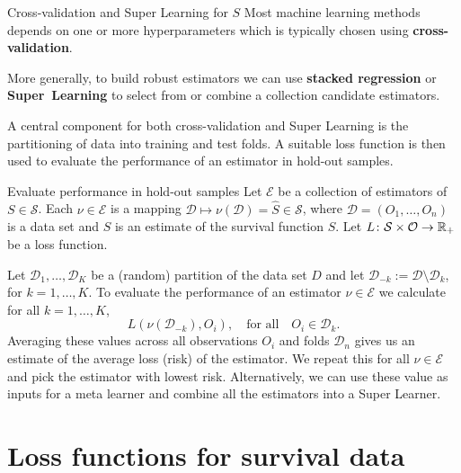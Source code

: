 \documentclass[smaller]{beamer}\usepackage{listings}
\newcommand{\est}{\ensuremath{\nu}}
\begin{document}
\begin{frame}[label={sec:orgb42da49}]{Cross-validation and Super Learning for \(S\)}
Most machine learning methods depends on one or more hyperparameters which is typically chosen using
\textbf{cross-validation}.

\vfill

More generally, to build robust estimators we can use \textbf{stacked regression} or
\textbf{Super~Learning} \citep{breiman1996stacked,van2007super} to select from or combine a
collection candidate estimators.

\vfill

A central component for both cross-validation and Super Learning is the partitioning of data into
training and test folds. A suitable loss function is then used to evaluate the performance of an
estimator in hold-out samples.
\end{frame}

\begin{frame}[label={sec:org847d0e8}]{Evaluate performance in hold-out samples}
Let \(\mathcal{E}\) be a collection of estimators of \(S \in \mathcal{S}\). Each \(\est \in
\mathcal{E}\) is a mapping \(\mathcal{D} \mapsto \est(\mathcal{D}) = \hat S \in \mathcal{S}\), where
\(\mathcal{D} = (O_1, \dots, O_n)\) is a data set and \(\hat S\) is an estimate of the survival
function \(S\). Let \(L \colon \mathcal{S} \times \mathcal{O} \rightarrow \mathbb{R}_+\) be a loss function.

\vfill

Let \(\mathcal{D}_1, \dots, \mathcal{D}_K\) be a (random) partition of the data set \(D\) and let
\(\mathcal{D}_{-k} := \mathcal{D} \setminus \mathcal{D}_{k}\), for \(k=1, \dots, K\). To evaluate
the performance of an estimator \(\est \in \mathcal{E}\) we calculate for all \(k =1, \dots, K\),
\begin{equation*}
L(\est(\mathcal{D}_{-k}), O_i),
\quad \text{for all} \quad O_i \in \mathcal{D}_k.
\end{equation*}
Averaging these values across all observations \(O_i\) and folds \(\mathcal{D}_n\) gives us an
estimate of the average loss (risk) of the estimator. We repeat this for all \(\est \in \mathcal{E}\)
and pick the estimator with lowest risk. Alternatively, we can use these value as inputs for a meta
learner and combine all the estimators into a Super Learner.
\end{frame}


\section{Loss functions for survival data}
\label{sec:org4895232}
\end{document}
